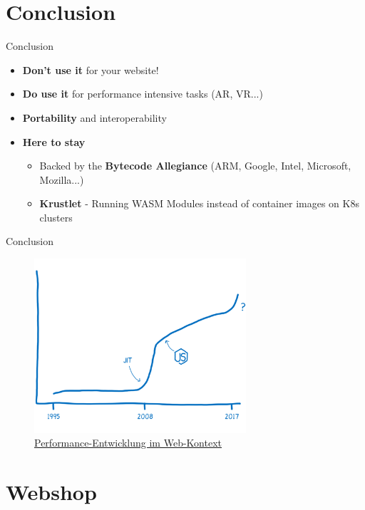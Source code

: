\documentclass{beamer}
\begin{document}
\section{Conclusion}

\begin{frame}{Conclusion}
\begin{itemize}
    \item \textbf{Don't use it} for your website!
    \item \textbf{Do use it} for performance intensive tasks (AR, VR...)
    \item \textbf{Portability} and interoperability
    \item \textbf{Here to stay}
    \begin{itemize}
        \item Backed by the \textbf{Bytecode Allegiance} (ARM, Google, Intel, Microsoft, Mozilla...)
        \item \textbf{Krustlet} - Running WASM Modules instead of container images on K8s clusters
    \end{itemize}
\end{itemize}
\end{frame}

\begin{frame}{Conclusion}
    \begin{figure}
        \includegraphics[width=0.7\textwidth,height=0.7\textheight]{./images/perf_history.png}
        \caption{\href{https://hacks.mozilla.org/2017/02/a-cartoon-intro-to-webassembly/}{Performance-Entwicklung im Web-Kontext}}
    \end{figure}
\end{frame}

\section{Webshop}
\end{document}
